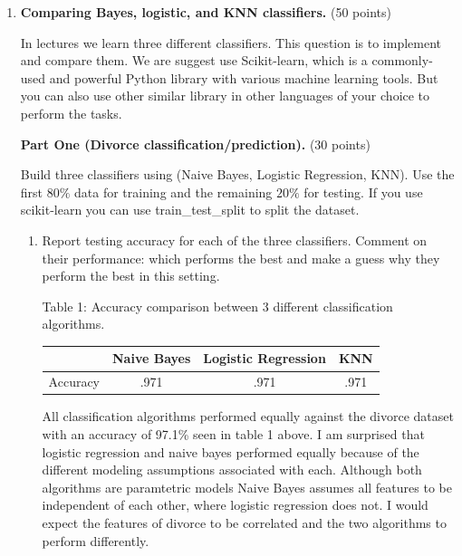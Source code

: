 \documentclass[twoside,10pt]{article}
\begin{document}
\begin{enumerate}
\begin{enumerate}
\end{enumerate}
 
\item {\bf Comparing Bayes, logistic, and KNN classifiers.} (50 points)

In lectures we learn three different classifiers. This question is to implement and compare them. We are suggest use \textsf{Scikit-learn}, which is a commonly-used and powerful \textsf{Python} library with various machine learning tools. But you can also use other similar library in other languages of your choice to perform the tasks. 



\textbf{Part One (Divorce classification/prediction).} (30 points) 





Build three classifiers using (Naive Bayes, Logistic Regression, KNN). Use the first $80\%$ data for training and the remaining $20\%$ for testing. If you use \textsf{scikit-learn} you can use \textsf{train\_test\_split} to split the dataset. 

\begin{enumerate}

	\item Report testing accuracy for each of the three classifiers.  Comment on their performance: which performs the best and make a guess why they perform the best in this setting. 
	
Table 1: Accuracy comparison between 3 different classification algorithms.
 
\begin{table}[h!]
\centering
\begin{tabular}{|| c | c | c | c ||} 
 \hline
  & Naive Bayes & Logistic Regression & KNN  \\ [0.5ex] 
 \hline\hline
 Accuracy & .971 & .971 & .971 \\ 
 \hline
\end{tabular}
\label{table:1}
\end{table}

All classification algorithms performed equally against the divorce dataset with an accuracy of 97.1\% seen in table 1 above.  I am surprised that logistic regression and naive bayes performed equally because of the different modeling assumptions associated with each.  Although both algorithms are paramtetric models Naive Bayes assumes all features to be independent of each other, where logistic regression does not.  I would expect the features of divorce to be correlated and the two algorithms to perform differently.


\end{enumerate}
\end{enumerate}
\end{document}

